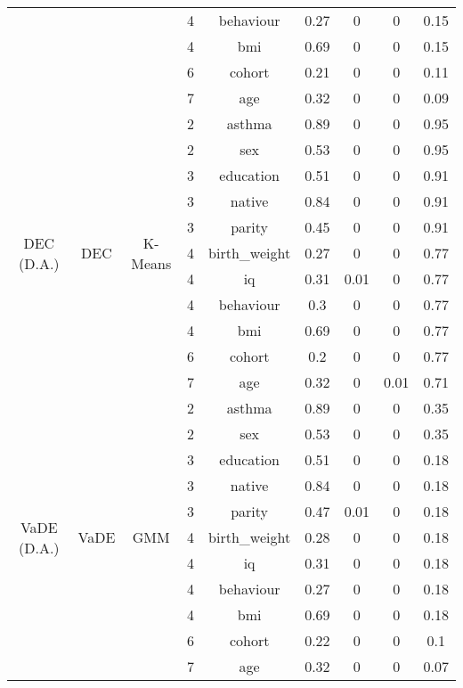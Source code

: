 \documentclass[CAT,BIB]{TFUOC}%
\begin{document}
\begin{center}
\begin{longtable}{@{}ccccccccc@{}}
            &  &  & 4 & behaviour & 0.27 & 0 & 0 & 0.15 \\
            &  &  & 4 & bmi & 0.69 & 0 & 0 & 0.15 \\
            &  &  & 6 & cohort & 0.21 & 0 & 0 & 0.11 \\
            &  &  & 7 & age & 0.32 & 0 & 0 & 0.09 \\ \midrule
            \multirow{11}{*}{DEC (D.A.)} & \multirow{11}{*}{DEC} & \multirow{11}{*}{K-Means} & 2 & asthma & 0.89 & 0 & 0 & 0.95 \\
            &  &  & 2 & sex & 0.53 & 0 & 0 & 0.95 \\
            &  &  & 3 & education & 0.51 & 0 & 0 & 0.91 \\
            &  &  & 3 & native & 0.84 & 0 & 0 & 0.91 \\
            &  &  & 3 & parity & 0.45 & 0 & 0 & 0.91 \\
            &  &  & 4 & birth\_weight & 0.27 & 0 & 0 & 0.77 \\
            &  &  & 4 & iq & 0.31 & 0.01 & 0 & 0.77 \\
            &  &  & 4 & behaviour & 0.3 & 0 & 0 & 0.77 \\
            &  &  & 4 & bmi & 0.69 & 0 & 0 & 0.77 \\
            &  &  & 6 & cohort & 0.2 & 0 & 0 & 0.77 \\
            &  &  & 7 & age & 0.32 & 0 & 0.01 & 0.71 \\ \midrule
            \multirow{11}{*}{VaDE (D.A.)} & \multirow{11}{*}{VaDE} & \multirow{11}{*}{GMM} & 2 & asthma & 0.89 & 0 & 0 & 0.35 \\
            &  &  & 2 & sex & 0.53 & 0 & 0 & 0.35 \\
            &  &  & 3 & education & 0.51 & 0 & 0 & 0.18 \\
            &  &  & 3 & native & 0.84 & 0 & 0 & 0.18 \\
            &  &  & 3 & parity & 0.47 & 0.01 & 0 & 0.18 \\
            &  &  & 4 & birth\_weight & 0.28 & 0 & 0 & 0.18 \\
            &  &  & 4 & iq & 0.31 & 0 & 0 & 0.18 \\
            &  &  & 4 & behaviour & 0.27 & 0 & 0 & 0.18 \\
            &  &  & 4 & bmi & 0.69 & 0 & 0 & 0.18 \\
            &  &  & 6 & cohort & 0.22 & 0 & 0 & 0.1 \\
            &  &  & 7 & age & 0.32 & 0 & 0 & 0.07 \\ \midrule

\end{longtable}
\end{center}
\end{document}
